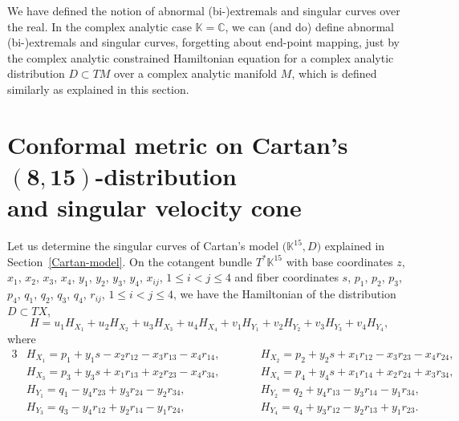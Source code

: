 \documentclass[11pt]{article}
\numberwithin{equation}{section}
\numberwithin{equation}{section}
\theoremstyle{definition}
\newcommand{\C}{\mathbb{C}}
\newcommand{\KK}{\mathbb{K}}
\newcommand{\0}{\boldsymbol{0}}
\begin{document}
\begin{Remark}
We have defined the notion of abnormal (bi-)extremals and singular curves over the real.
In the complex analytic case $\KK = \C$, we can (and do) define abnormal (bi-)extremals and singular curves, forgetting
about end-point mapping,
just by the complex analytic constrained Hamiltonian equation for a complex analytic distribution $D \subset TM$
over a complex analytic manifold $M$, which is defined similarly as explained in this section.
\end{Remark}


\section[Conformal metric on Cartan's (8, 15)-distribution and singular velocity cone]{Conformal metric on Cartan's $\boldsymbol{(8, 15)}$-distribution\\ and singular velocity cone}
\label{Singular-velocity}

Let us determine the singular curves of Cartan's model $\bigl(\KK^{15}, D\bigr)$
explained in Section~\ref{Cartan-model}.
On the cotangent bundle $T^*\KK^{15}$ with base coordinates
$z$, $x_1$, $x_2$, $x_3$, $x_4$, $y_1$, $y_2$, $y_3$, $y_4$, $x_{ij}$, ${1 \leq i < j \leq 4}$ and
fiber coordinates
$s$, $p_1$, $p_2$, $p_3$, $p_4$, $q_1$, $q_2$, $q_3$, $q_4$, $r_{ij}$, $1 \leq i < j \leq 4$,
we have the Hamiltonian of the distribution $D \subset TX$,
\[
H = u_1H_{X_1} + u_2H_{X_2} + u_3H_{X_3} + u_4H_{X_4} + v_1H_{Y_1} + v_2H_{Y_2} + v_3H_{Y_3} + v_4H_{Y_4},
\]
where
\begin{alignat*}{3}
&H_{X_1} = p_1 + y_1s - x_2r_{12} - x_3r_{13} - x_4r_{14}, \qquad&&
H_{X_2} = p_2 + y_2s + x_1r_{12} - x_3r_{23} - x_4r_{24},&
\\
&H_{X_3} = p_3 + y_3s + x_1r_{13} + x_2r_{23} - x_4r_{34}, \qquad&&
H_{X_4} = p_4 + y_4s + x_1r_{14} + x_2r_{24} + x_3r_{34},&
\\
&H_{Y_1} = q_1 - y_4r_{23} + y_3r_{24} - y_2r_{34}, \qquad&&
H_{Y_2} = q_2 + y_4r_{13} - y_3r_{14} - y_1r_{34},&
\\
&H_{Y_3} = q_3 - y_4r_{12} + y_2r_{14} - y_1r_{24}, \qquad&&
H_{Y_4} = q_4 + y_3r_{12} - y_2r_{13} + y_1r_{23}.&
\end{alignat*}
\end{document}
